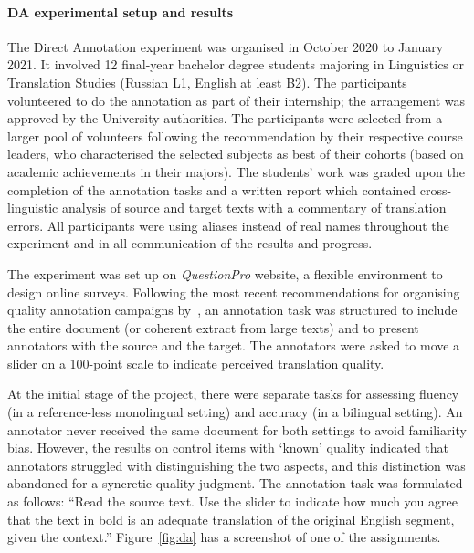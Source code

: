 \paragraph{DA experimental setup and results} 
The Direct Annotation experiment was organised in October 2020 to January 2021. It involved 12 final-year bachelor degree students majoring in Linguistics or Translation Studies (Russian L1, English at least B2). The participants volunteered to do the annotation as part of their internship; the arrangement was approved by the University authorities. The participants were selected from a larger pool of volunteers following the recommendation by their respective course leaders, who characterised the selected subjects as best of their cohorts (based on academic achievements in their majors). 
The students' work was graded upon the completion of the annotation tasks and a written report which contained cross-linguistic analysis of source and target texts with a commentary of translation errors. All participants were using aliases instead of real names throughout the experiment and in all communication of the results and progress. 

The experiment was set up on \textit{QuestionPro} website, a flexible environment to design online surveys. Following the most recent recommendations for organising quality annotation campaigns by~\citet{Laubli2020}, an annotation task was structured to include the entire document (or coherent extract from large texts) and to present annotators with the source and the target. The annotators were asked to move a slider on a 100-point scale to indicate perceived translation quality.

At the initial stage of the project, there were separate tasks for assessing fluency (in a reference-less monolingual setting) and accuracy (in a bilingual setting). An annotator never received the same document for both settings to avoid familiarity bias. However, the results on control items with `known' quality indicated that annotators struggled with distinguishing the two aspects, and this distinction was abandoned for a syncretic quality judgment. The annotation task was formulated as follows: ``Read the source text. Use the slider to indicate how much you agree that the text in bold is an adequate translation of the original English segment, given the context.'' Figure~\ref{fig:da} has a screenshot of one of the assignments.

